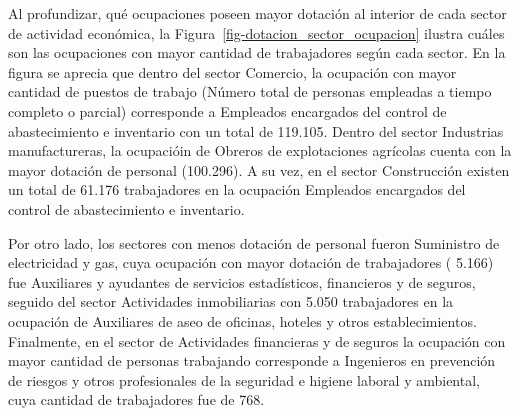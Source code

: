 \documentclass[
  11pt,
]{article}
\begin{document}
\begin{table}

\caption{\label{tbl-certificaciones_tot}Certificaciones de ocupaciones
contratadas los últimos doce meses}


\end{table}%

Al profundizar, qué ocupaciones poseen mayor dotación al interior de
cada sector de actividad económica, la
Figura~\ref{fig-dotacion_sector_ocupacion} ilustra cuáles son las
ocupaciones con mayor cantidad de trabajadores según cada sector. En la
figura se aprecia que dentro del sector Comercio, la ocupación con mayor
cantidad de puestos de trabajo (Número total de personas empleadas a
tiempo completo o parcial) corresponde a Empleados encargados del
control de abastecimiento e inventario con un total de 119.105. Dentro
del sector Industrias manufactureras, la ocupacióin de Obreros de
explotaciones agrícolas cuenta con la mayor dotación de personal
(100.296). A su vez, en el sector Construcción existen un total de
61.176 trabajadores en la ocupación Empleados encargados del control de
abastecimiento e inventario.

Por otro lado, los sectores con menos dotación de personal fueron
Suministro de electricidad y gas, cuya ocupación con mayor dotación de
trabajadores ( 5.166) fue Auxiliares y ayudantes de servicios
estadísticos, financieros y de seguros, seguido del sector Actividades
inmobiliarias con 5.050 trabajadores en la ocupación de Auxiliares de
aseo de oficinas, hoteles y otros establecimientos. Finalmente, en el
sector de Actividades financieras y de seguros la ocupación con mayor
cantidad de personas trabajando corresponde a Ingenieros en prevención
de riesgos y otros profesionales de la seguridad e higiene laboral y
ambiental, cuya cantidad de trabajadores fue de 768.
\end{document}
